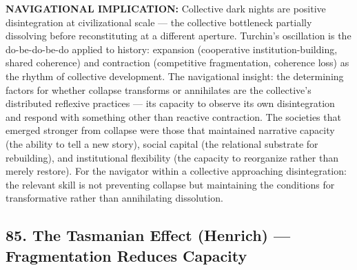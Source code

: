 \textbf{NAVIGATIONAL IMPLICATION:} Collective dark nights are positive disintegration at civilizational scale — the collective bottleneck partially dissolving before reconstituting at a different aperture. Turchin's oscillation is the do-be-do-be-do applied to history: expansion (cooperative institution-building, shared coherence) and contraction (competitive fragmentation, coherence loss) as the rhythm of collective development. The navigational insight: the determining factors for whether collapse transforms or annihilates are the collective's distributed reflexive practices — its capacity to observe its own disintegration and respond with something other than reactive contraction. The societies that emerged stronger from collapse were those that maintained narrative capacity (the ability to tell a new story), social capital (the relational substrate for rebuilding), and institutional flexibility (the capacity to reorganize rather than merely restore). For the navigator within a collective approaching disintegration: the relevant skill is not preventing collapse but maintaining the conditions for transformative rather than annihilating dissolution.


\bigskip\noindent\makebox[\textwidth]{\color{rulegray}\rule{5cm}{0.3pt}}\bigskip


\subsection*{85. The Tasmanian Effect (Henrich) — Fragmentation Reduces Capacity}


